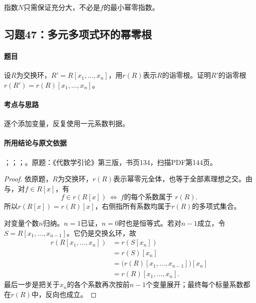 指数$N$只需保证充分大，不必是$f$的最小幂零指数。



\subsection{习题47：多元多项式环的幂零根}

\label{ex:3:47}

\paragraph{题目}

设$R$为交换环，$R'=R[x_1,\ldots,x_n]$，用$r(R)$表示$R$的诣零根。证明$R'$的诣零根$r(R')=r(R)[x_1,\ldots,x_n]$。

\paragraph{考点与思路}

逐个添加变量，反复使用一元系数判据。

\paragraph{所用结论与原文依据}

；；；。原题：《代数学引论》第三版，书页134，扫描PDF第144页。


\begin{proof}

依原题，$R$为交换环，$r(R)$表示幂零元全体，也等于全部素理想之交。由与，对$f\in R[x]$，有
\[
f\in r(R[x])\ \Longleftrightarrow\ f\text{的每个系数属于 }r(R).
\]
所以$r(R[x])=r(R)[x]$，右侧指所有系数均属于$r(R)$的多项式集合。

对变量个数$n$归纳。$n=1$已证，$n=0$时也是恒等式。若对$n-1$成立，令$S=R[x_1,\ldots,x_{n-1}]$。它仍是交换幺环，故
\begin{align*}
r(R[x_1,\ldots,x_n])
&=r(S[x_n])\\
&=r(S)[x_n]\\
&=\bigl(r(R)[x_1,\ldots,x_{n-1}]\bigr)[x_n]\\
&=r(R)[x_1,\ldots,x_n].
\end{align*}
最后一步是把关于$x_n$的各个系数再次按前$n-1$个变量展开；最终每个标量系数都在$r(R)$中，反向也成立。

\end{proof}

